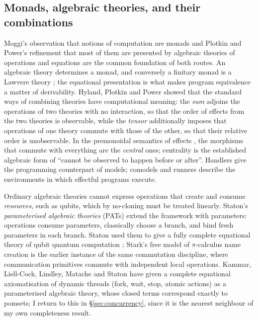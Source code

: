 \subsection{Monads, algebraic theories, and their combinations}

Moggi's observation that notions of computation are monads \cite{MOGGI199155,moggi1991monadicmetalanguage} and Plotkin and Power's refinement that most of them are presented by algebraic theories of operations and equations \cite{plotkin_power_2002,PlotkinPower04CompEffectsOverview} are the common foundation of both routes. An algebraic theory determines a monad, and conversely a finitary monad is a Lawvere theory \cite{lawveretheories_monads_HYLAND2007437}; the equational presentation is what makes program equivalence a matter of derivability. Hyland, Plotkin and Power \cite{sums_tensors_HYLAND200670} showed that the standard ways of combining theories have computational meaning: the \emph{sum} adjoins the operations of two theories with no interaction, so that the order of effects from the two theories is observable, while the \emph{tensor} additionally imposes that operations of one theory commute with those of the other, so that their relative order is unobservable. In the premonoidal semantics of effects \cite{premonoidal_cat_POWER_ROBINSON_1997,PowerRobinson97premonoidal,fuhrmann1999premonoidal}, the morphisms that commute with everything are the \emph{central} ones; centrality is the established algebraic form of ``cannot be observed to happen before or after''. Handlers \cite{bauer2019algebraicalgebraiceffectshandlers} give the programming counterpart of models; comodels and runners \cite{model_comodel_PLOTKIN2008295,runners_10.1007/978-3-030-44914-8_2} describe the environments in which effectful programs execute.

Ordinary algebraic theories cannot express operations that create and consume \emph{resources}, such as qubits, which by no-cloning must be treated linearly. Staton's \emph{parameterised algebraic theories} (PATs) \cite{statonlics13,statonpopl15} extend the framework with parameters: operations consume parameters, classically choose a branch, and bind fresh parameters in each branch. Staton used them to give a fully complete equational theory of qubit quantum computation \cite{statonpopl15}; Stark's free model of $\pi$-calculus name creation \cite{stark:freamp} is the earlier instance of the same commutation discipline, where communication primitives commute with independent local operations. Kammar, Liell-Cock, Lindley, Matache and Staton \cite{kammar2026threads} have given a complete equational axiomatisation of dynamic threads (fork, wait, stop, atomic actions) as a parameterised algebraic theory, whose closed terms correspond exactly to pomsets; I return to this in \S\ref{sec:concurrency}, since it is the nearest neighbour of my own completeness result.

